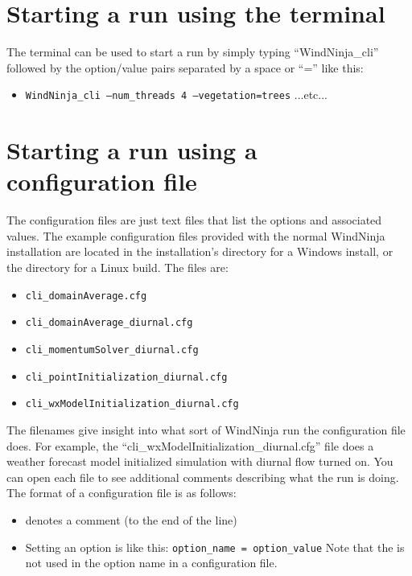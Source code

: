 \documentclass[12pt]{article}
\begin{document}
\section*{Starting a run using the terminal}
The terminal can be used to start a run by simply typing “WindNinja\_cli” followed by the option/value pairs separated by a space or “=” like this:
\begin{itemize}
\item[] \texttt{WindNinja\_cli --num\_threads 4 --vegetation=trees} ...etc...
\end{itemize}

\section*{Starting a run using a configuration file}
The configuration files are just text files that list the options and associated values.  The example configuration files provided with the normal WindNinja installation are located in the installation's  directory for a Windows install, or the  directory for a Linux build.  The files are:
\begin{itemize}
\item[] \texttt{cli\_domainAverage.cfg}
\item[] \texttt{cli\_domainAverage\_diurnal.cfg}
\item[] \texttt{cli\_momentumSolver\_diurnal.cfg}
\item[] \texttt{cli\_pointInitialization\_diurnal.cfg}
\item[] \texttt{cli\_wxModelInitialization\_diurnal.cfg}
\end{itemize}

The filenames give insight into what sort of WindNinja run the configuration file does.  For example, the “cli\_wxModelInitialization\_diurnal.cfg” file does a weather forecast model initialized simulation with diurnal flow turned on.  You can open each file to see additional comments describing what the run is doing.  The format of a configuration file is as follows:
\begin{itemize}
\item \say{\texttt{\#}} denotes a comment (to the end of the line)
\item Setting an option is like this:  \texttt{option\_name  =  option\_value}\newline
Note that the \say{\texttt{--}} is not used in the option name in a configuration file.

\end{itemize}
\end{document}
